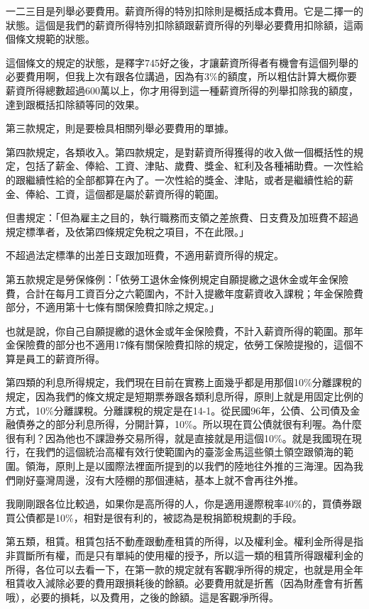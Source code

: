 \documentclass[]{ctexbook}
\begin{document}
一二三目是列舉必要費用。薪資所得的特別扣除則是概括成本費用。它是二擇一的狀態。這個是我們的薪資所得特別扣除額跟薪資所得的列舉必要費用扣除額，這兩個條文規範的狀態。

這個條文的規定的狀態，是釋字745好之後，才讓薪資所得者有機會有這個列舉的必要費用啊，但我上次有跟各位講過，因為有3\%的額度，所以粗估計算大概你要薪資所得總數超過600萬以上，你才用得到這一種薪資所得的列舉扣除我的額度，達到跟概括扣除額等同的效果。

第三款規定，則是要檢具相關列舉必要費用的單據。

第四款規定，各類收入。第四款規定，是對薪資所得獲得的收入做一個概括性的規定，包括了薪金、俸給、工資、津貼、歲費、獎金、紅利及各種補助費。一次性給的跟繼續性給的全部都算在內了。一次性給的獎金、津貼，或者是繼續性給的薪金、俸給、工資，這個都是屬於薪資所得的範圍。

但書規定：「但為雇主之目的，執行職務而支領之差旅費、日支費及加班費不超過規定標準者，及依第四條規定免稅之項目，不在此限。」

不超過法定標準的出差日支跟加班費，不適用薪資所得的規定。

第五款規定是勞保條例：「依勞工退休金條例規定自願提繳之退休金或年金保險費，合計在每月工資百分之六範圍內，不計入提繳年度薪資收入課稅；年金保險費部分，不適用第十七條有關保險費扣除之規定。」

也就是說，你自己自願提繳的退休金或年金保險費，不計入薪資所得的範圍。那年金保險費的部分也不適用17條有關保險費扣除的規定，依勞工保險提撥的，這個不算是員工的薪資所得。

第四類的利息所得規定，我們現在目前在實務上面幾乎都是用那個10\%分離課稅的規定，因為我們的條文規定是短期票券跟各類利息所得，原則上就是用固定比例的方式，10\%分離課稅。分離課稅的規定是在14-1。從民國96年，公債、公司債及金融債券之的部分利息所得，分開計算，10\%。所以現在買公債就很有利喔。為什麼很有利？因為他也不課證券交易所得，就是直接就是用這個10\%。就是我國現在現行，在我們的這個統治高權有效行使範圍內的臺澎金馬這些領土領空跟領海的範圍。領海，原則上是以國際法裡面所提到的以我們的陸地往外推的三海浬。因為我們剛好臺灣周邊，沒有大陸棚的那個連結，基本上就不會再往外推。

我剛剛跟各位比較過，如果你是高所得的人，你是適用邊際稅率40\%的，買債券跟買公債都是10\%，相對是很有利的，被認為是稅捐節稅規劃的手段。

第五類，租賃。租賃包括不動產跟動產租賃的所得，以及權利金。權利金所得是指非買斷所有權，而是只有單純的使用權的授予，所以這一類的租賃所得跟權利金的所得，各位可以去看一下，在第一款的規定就有客觀凈所得的規定，也就是用全年租賃收入減除必要的費用跟損耗後的餘額。必要費用就是折舊（因為財產會有折舊哦），必要的損耗，以及費用，之後的餘額。這是客觀凈所得。
\end{document}
